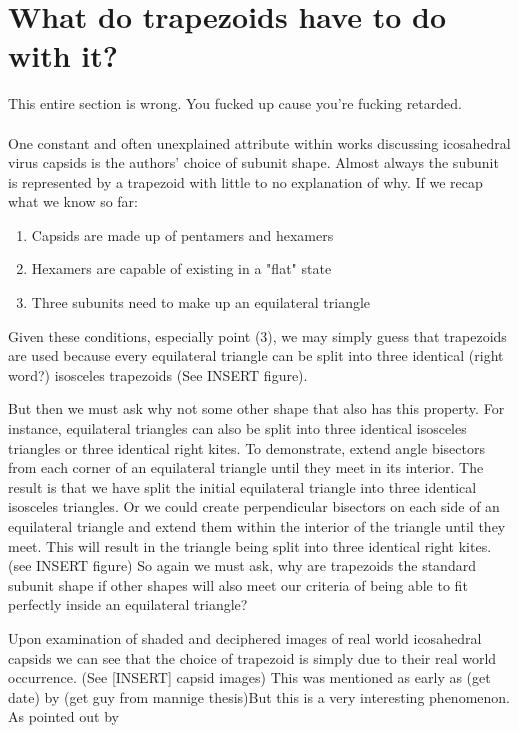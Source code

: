 \documentclass[12pt,letter]{article}
\begin{document}
\section{What do trapezoids have to do with it?}
This entire section is wrong. You fucked up cause you're fucking retarded.

\paragraph{}
One constant and often unexplained attribute within works discussing icosahedral virus capsids is the authors' choice of subunit shape. Almost always the subunit is represented by a trapezoid with little to no explanation of why. If we recap what we know so far:
\begin{enumerate}
	\item Capsids are made up of pentamers and hexamers
	\item Hexamers are capable of existing in a "flat" state
	\item Three subunits need to make up an equilateral triangle
\end{enumerate}
Given these conditions, especially point (3), we may simply guess that trapezoids are used because every equilateral triangle can be split into three identical (right word?) isosceles trapezoids (See INSERT figure). 

But then we must ask why not some other shape that also has this property. For instance, equilateral triangles can also be split into three identical isosceles triangles or three identical right kites. To demonstrate, extend angle bisectors from each corner of an equilateral triangle until they meet in its interior. The result is that we have split the initial equilateral triangle into three identical isosceles triangles. Or we could create perpendicular bisectors on each side of an equilateral triangle and extend them within the interior of the triangle until they meet. This will result in the triangle being split into three identical right kites. (see INSERT figure) So again we must ask, why are trapezoids the standard subunit shape if other shapes will also meet our criteria of being able to fit perfectly inside an equilateral triangle?

Upon examination of shaded and deciphered images of real world icosahedral capsids we can see that the choice of trapezoid is simply due to their real world occurrence. (See [INSERT] capsid images) This was mentioned as early as (get date) by (get guy from mannige thesis)But this is a very interesting phenomenon. As pointed out by 





\end{document}
